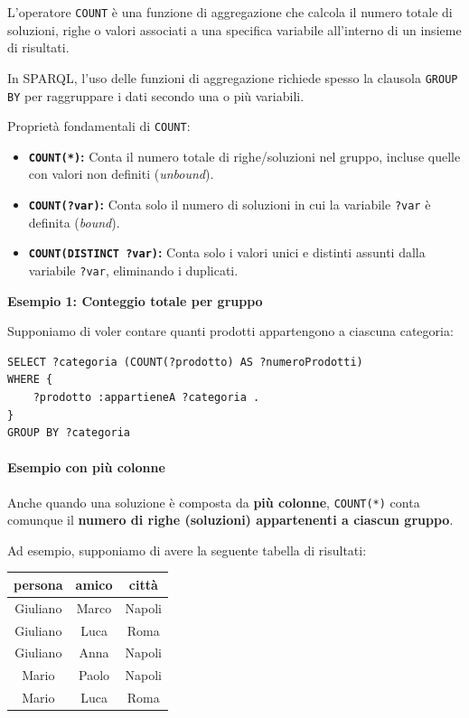 L'operatore \texttt{COUNT} è una funzione di aggregazione che calcola il numero totale di soluzioni, righe o valori associati a una specifica variabile all'interno di un insieme di risultati.

In SPARQL, l'uso delle funzioni di aggregazione richiede spesso la clausola \texttt{GROUP BY} per raggruppare i dati secondo una o più variabili.

Proprietà fondamentali di \texttt{COUNT}:
\begin{itemize}
    \item \textbf{\texttt{COUNT(*)}:} Conta il numero totale di righe/soluzioni nel gruppo, incluse quelle con valori non definiti (\textit{unbound}).
    \item \textbf{\texttt{COUNT(?var)}:} Conta solo il numero di soluzioni in cui la variabile \texttt{?var} è definita (\textit{bound}).
    \item \textbf{\texttt{COUNT(DISTINCT ?var)}:} Conta solo i valori unici e distinti assunti dalla variabile \texttt{?var}, eliminando i duplicati.
\end{itemize}

\textbf{Esempio 1: Conteggio totale per gruppo}

Supponiamo di voler contare quanti prodotti appartengono a ciascuna categoria:

\begin{verbatim}
SELECT ?categoria (COUNT(?prodotto) AS ?numeroProdotti)
WHERE {
    ?prodotto :appartieneA ?categoria .
}
GROUP BY ?categoria
\end{verbatim}

\paragraph{Esempio con più colonne}

Anche quando una soluzione è composta da \textbf{più colonne}, \texttt{COUNT(*)} conta comunque il \textbf{numero di righe (soluzioni) appartenenti a ciascun gruppo}.

Ad esempio, supponiamo di avere la seguente tabella di risultati:

\begin{center}
\begin{tabular}{c|c|c}
\textbf{persona} & \textbf{amico} & \textbf{città} \\
\hline
Giuliano & Marco & Napoli \\
Giuliano & Luca & Roma \\
Giuliano & Anna & Napoli \\
Mario & Paolo & Napoli \\
Mario & Luca & Roma
\end{tabular}
\end{center}

